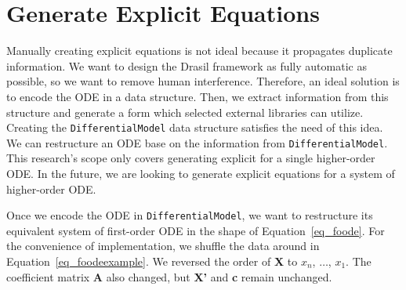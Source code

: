 \section{Generate Explicit Equations}
Manually creating explicit equations is not ideal because it propagates duplicate information. We want to design the Drasil framework as fully automatic as possible, so we want to remove human interference. Therefore, an ideal solution is to encode the ODE in a data structure. Then, we extract information from this structure and generate a form which selected external libraries can utilize. Creating the \verb|DifferentialModel| data structure satisfies the need of this idea. We can restructure an ODE base on the information from \verb|DifferentialModel|. This research's scope only covers generating explicit for a single higher-order ODE. In the future, we are looking to generate explicit equations for a system of higher-order ODE.

Once we encode the ODE in \verb|DifferentialModel|, we want to restructure its equivalent system of first-order ODE in the shape of Equation~\ref{eq_foode}. For the convenience of implementation, we shuffle the data around in Equation~\ref{eq_foodeexample}. We reversed the order of \textbf{X} to $x_{n}$, $\dots$, $x_{1}$. 
The coefficient matrix \textbf{A} also changed, but \textbf{X'} and \textbf{c} remain unchanged.



